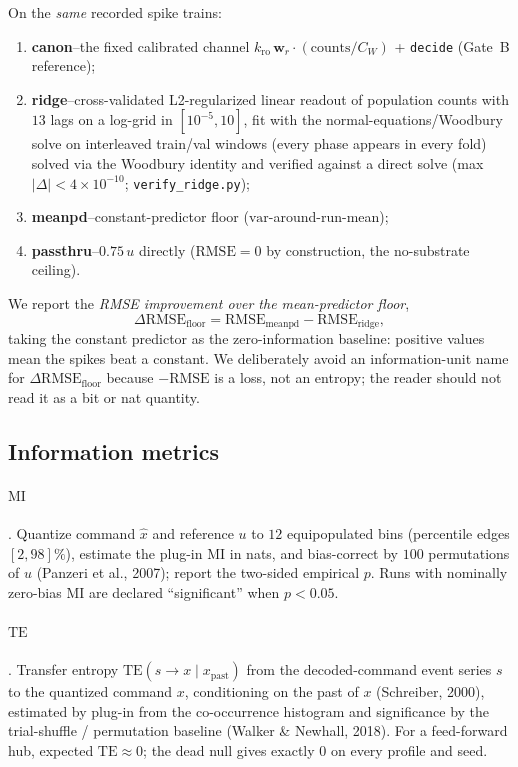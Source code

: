 \documentclass[12pt]{article}
\begin{document}
On the \emph{same} recorded spike trains:
\begin{enumerate}[nosep]
\item \textbf{canon}--the fixed calibrated channel
$k_{\mathrm{ro}}\,\mathbf{w}_r\!\cdot(\mathrm{counts}/C_W)$ +
\texttt{decide} (Gate~B reference);
\item \textbf{ridge}--cross-validated L2-regularized linear readout of
population counts with $13$ lags on a log-grid in
$[10^{-5},10]$, fit with the normal-equations/Woodbury solve on
interleaved train/val windows (every phase appears in every fold)
solved via the Woodbury identity and verified against a direct solve
(max $|\Delta|<4\times10^{-10}$; \texttt{verify\_ridge.py});
\item \textbf{meanpd}--constant-predictor floor
($\mathrm{var}$-around-run-mean);
\item \textbf{passthru}--$0.75\,u$ directly ($\mathrm{RMSE}=0$ by construction,
the no-substrate ceiling).
\end{enumerate}
We report the \emph{RMSE improvement over the mean-predictor floor},
\[
\Delta\mathrm{RMSE}_{\mathrm{floor}} = \mathrm{RMSE}_{\mathrm{meanpd}}-\mathrm{RMSE}_{\mathrm{ridge}},
\]
taking the constant predictor as the zero-information baseline:
positive values mean the spikes beat a constant. We deliberately avoid
an information-unit name for $\Delta\mathrm{RMSE}_{\mathrm{floor}}$ because $-\mathrm{RMSE}$ is a loss, not
an entropy; the reader should not read it as a bit or nat quantity.

\subsection{Information metrics}\label{sec:metrics}

\paragraph{$\mathrm{MI}$}. Quantize command $\hat{x}$ and reference $u$ to
$12$ equipopulated bins (percentile edges $[2,98]\%$), estimate the
plug-in $\mathrm{MI}$ in nats, and bias-correct by $100$ permutations of $u$
(Panzeri et al., 2007); report the two-sided empirical $p$. Runs with
nominally zero-bias MI are declared ``significant'' when $p<0.05$.

\paragraph{$\mathrm{TE}$}. Transfer entropy $\mathrm{TE}(s\to x\mid x_{\mathrm{past}})$
from the decoded-command event series $s$ to the quantized command
$x$, conditioning on the past of $x$ (Schreiber, 2000), estimated by
plug-in from the co-occurrence histogram and significance by the
trial-shuffle / permutation baseline (Walker \& Newhall, 2018). For a
feed-forward hub, expected $\mathrm{TE}\approx0$; the dead null gives exactly
$0$ on every profile and seed.
\end{document}
